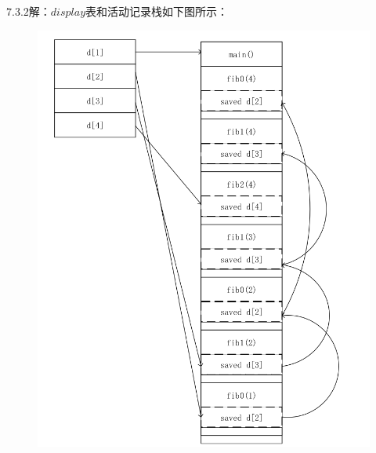 \documentclass[UTF8,noindent]{ctexart}
\begin{document}
$7.3.2$解：$display$表和活动记录栈如下图所示：
\begin{figure}[H]
  \centering
  \includegraphics[scale = 0.4]{./fig/7-3-2.png}
\end{figure}
\end{document}
